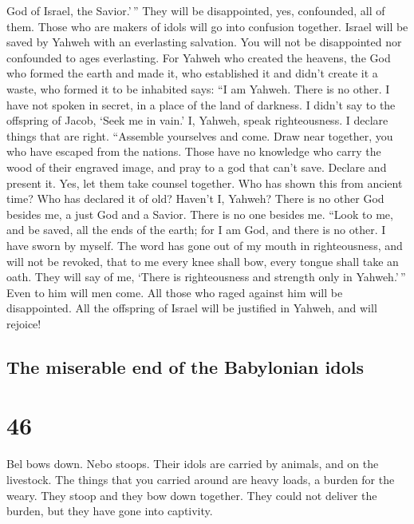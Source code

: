 God of Israel, the Savior.'\,''  They will be
disappointed, yes, confounded, all of them. Those who are makers of
idols will go into confusion together.  Israel will be
saved by Yahweh with an everlasting salvation. You will not be
disappointed nor confounded to ages everlasting.  For
Yahweh who created the heavens, the God who formed the earth and made
it, who established it and didn't create it a waste, who formed it to be
inhabited says: ``I am Yahweh. There is no other.  I have
not spoken in secret, in a place of the land of darkness. I didn't say
to the offspring of Jacob, `Seek me in vain.' I, Yahweh, speak
righteousness. I declare things that are right. 
``Assemble yourselves and come. Draw near together, you who have escaped
from the nations. Those have no knowledge who carry the wood of their
engraved image, and pray to a god that can't save. 
Declare and present it. Yes, let them take counsel together. Who has
shown this from ancient time? Who has declared it of old? Haven't I,
Yahweh? There is no other God besides me, a just God and a Savior. There
is no one besides me.  ``Look to me, and be saved, all
the ends of the earth; for I am God, and there is no other.
 I have sworn by myself. The word has gone out of my
mouth in righteousness, and will not be revoked, that to me every knee
shall bow, every tongue shall take an oath.  They will
say of me, `There is righteousness and strength only in Yahweh.'\,''
Even to him will men come. All those who raged against him will be
disappointed.  All the offspring of Israel will be
justified in Yahweh, and will rejoice!

\hypertarget{the-miserable-end-of-the-babylonian-idols}{%
\subsection{The miserable end of the Babylonian
idols}\label{the-miserable-end-of-the-babylonian-idols}}

\hypertarget{section-45}{%
\section{46}\label{section-45}}

 Bel bows down. Nebo stoops. Their idols are carried by
animals, and on the livestock. The things that you carried around are
heavy loads, a burden for the weary.  They stoop and they
bow down together. They could not deliver the burden, but they have gone
into captivity.


